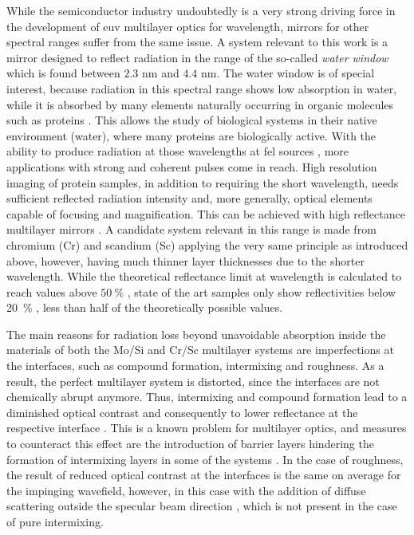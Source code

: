 While the semiconductor industry undoubtedly is a very strong driving force in the development of \gls{euv} multilayer optics for  wavelength, mirrors for other spectral ranges suffer from the same issue. A system relevant to this work is a mirror designed to reflect radiation in the range of the so-called \emph{water window} which is found between $2.3$ nm and $4.4$ nm. The water window is of special interest, because radiation in this spectral range shows low absorption in water, while it is absorbed by many elements naturally occurring in organic molecules such as proteins \cite{kirz_soft_1995}. This allows the study of biological systems in their native environment (water), where many proteins are biologically active. With the ability to produce radiation at those wavelengths at \gls{fel} sources \cite{ackermann_operation_2007, schreiber_first_2011}, more applications with strong and coherent pulses come in reach. High resolution imaging of protein samples, in addition to requiring the short wavelength, needs sufficient reflected radiation intensity and, more generally, optical elements capable of focusing and magnification. This can be achieved with high reflectance multilayer mirrors \cite{hertz_normal-incidence_1999,legall_compact_2012}. A candidate system relevant in this range is made from chromium (Cr) and scandium (Sc) applying the very same principle as introduced above, however, having much thinner layer thicknesses due to the shorter wavelength. While the theoretical reflectance limit at  wavelength is calculated to reach values above $\SI{50}{\percent}$ \cite{schafers_cr/sc_1998}, state of the art samples only show reflectivities below \SI{20}{\percent} \cite{eriksson_14.5_2003, yulin_high-performance_2004}, less than half of the theoretically possible values.

The main reasons for radiation loss beyond unavoidable absorption inside the materials of both the Mo/Si and Cr/Sc multilayer systems are imperfections at the interfaces, such as compound formation, intermixing and roughness. As a result, the perfect multilayer system is distorted, since the interfaces are not chemically abrupt anymore. Thus, intermixing and compound formation lead to a diminished optical contrast and consequently to lower reflectance at the respective interface \cite{nakajima_interdiffusion_1988}. This is a known problem for multilayer optics, and measures to counteract this effect are the introduction of barrier layers hindering the formation of intermixing layers in some of the systems \cite{braun_grenzflachen-optimierte_2003,braun_mo/si_2002}. In the case of roughness, the result of reduced optical contrast at the interfaces is the same on average for the impinging wavefield, however, in this case with the addition of diffuse scattering outside the specular beam direction \cite{sinha_x-ray_1994}, which is not present in the case of pure intermixing.


